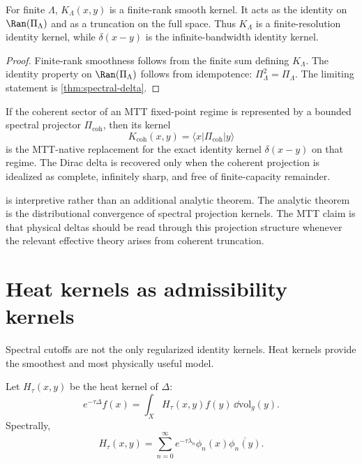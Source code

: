 \documentclass[11pt]{article}
\begin{document}
\begin{corollary}\label{cor:finite-proj}
For finite \(\Lambda\), \(K_\Lambda(x,y)\) is a finite-rank smooth kernel. It acts as the
identity on \(\Ran(\Pi_\Lambda)\) and as a truncation on the full space.  Thus
\(K_\Lambda\) is a finite-resolution identity kernel, while \(\delta(x-y)\) is the
infinite-bandwidth identity kernel.
\end{corollary}

\begin{proof}
Finite-rank smoothness follows from the finite sum defining \(K_\Lambda\).  The identity
property on \(\Ran(\Pi_\Lambda)\) follows from idempotence:
\(\Pi_\Lambda^2=\Pi_\Lambda\).  The limiting statement is \cref{thm:spectral-delta}.
\end{proof}

\begin{corollary}\label{cor:mtt-reading}
If the coherent sector of an MTT fixed-point regime is represented by a bounded spectral
projector \(\Pi_{\mathrm{coh}}\), then its kernel
\begin{equation}
K_{\mathrm{coh}}(x,y)=\langle x|\Pi_{\mathrm{coh}}|y\rangle
\end{equation}
is the MTT-native replacement for the exact identity kernel \(\delta(x-y)\) on that
regime.  The Dirac delta is recovered only when the coherent projection is idealized as
complete, infinitely sharp, and free of finite-capacity remainder.
\end{corollary}

\begin{remark}
 is interpretive rather than an additional analytic theorem.  The
analytic theorem is the distributional convergence of spectral projection kernels.  The MTT
claim is that physical deltas should be read through this projection structure whenever the
relevant effective theory arises from coherent truncation.
\end{remark}

\section{Heat kernels as admissibility kernels}

Spectral cutoffs are not the only regularized identity kernels.  Heat kernels provide the
smoothest and most physically useful model.

Let \(H_\tau(x,y)\) be the heat kernel of \(\Delta\):
\begin{equation}
e^{-\tau\Delta}f(x)=\int_X H_\tau(x,y)f(y)\,\dd\mathrm{vol}_g(y).
\end{equation}
Spectrally,
\begin{equation}
H_\tau(x,y)=\sum_{n=0}^{\infty}e^{-\tau\lambda_n}\phi_n(x)\overline{\phi_n(y)}.
\end{equation}
\end{document}
